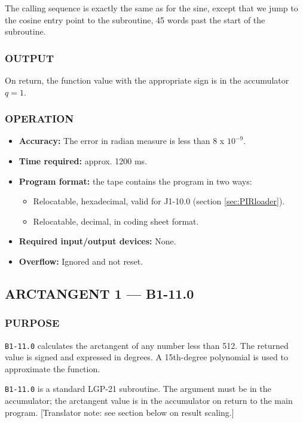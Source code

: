 The calling sequence is exactly the same as for the sine, except that we jump to the cosine entry point to the subroutine, 45 words past the start of the subroutine.

\subsubsection*{OUTPUT}
On return, the function value with the appropriate sign is in the accumulator $q=1$.

\subsubsection*{OPERATION}
\begin{itemize}
    \item \textbf{Accuracy:} The error in radian measure is less than 8 x $10^{-9}$.
    \item \textbf{Time required:} approx. 1200 ms.
    \item \textbf{Program format:} the tape contains the program in two ways:
    \begin{itemize}
      \item Relocatable, hexadecimal, valid for J1-10.0 (section \ref{sec:PIRloader}).
        \item Relocatable, decimal, in coding sheet format.
    \end{itemize}
    \item \textbf{Required input/output devices:} None.
    \item \textbf{Overflow:} Ignored and not reset.
\end{itemize}

\newpage

\subsection*{ARCTANGENT 1 --- B1-11.0}
\label{sec:arctangent_1}

\subsubsection*{PURPOSE}
\texttt{B1-11.0} calculates the arctangent of any number less than 512. The returned value is signed and expressed in degrees. A 15th-degree polynomial is used to approximate the function.

\texttt{B1-11.0} is a standard LGP-21 subroutine. The argument must be in the accumulator; the arctangent value is in the accumulator on return to the main program. [Translator note: see section below on result scaling.]


